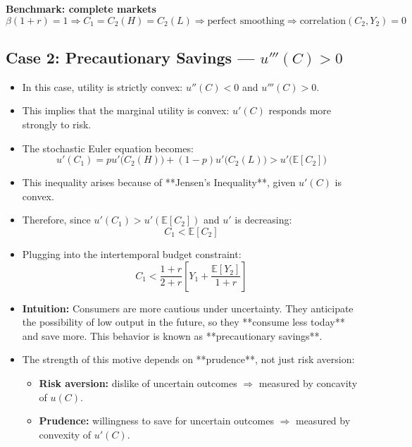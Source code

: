 \documentclass[12pt]{article}
\begin{document}
\textbf{Benchmark: complete markets}
\[
\beta(1 + r) = 1 \Rightarrow C_1 = C_2(H) = C_2(L) \Rightarrow \text{perfect smoothing}
\Rightarrow \text{correlation}(C_2, Y_2) = 0
\]

\subsection*{\noindent\textbf{Case 2: Precautionary Savings --- $u'''(C) > 0$}}  

\begin{itemize}
    \item In this case, utility is strictly convex: $u''(C) < 0$ and $u'''(C) > 0$.
    \item This implies that the marginal utility is convex: $u'(C)$ responds more strongly to risk.
    
    \item The stochastic Euler equation becomes:
    \[
    u'(C_1) = pu'\big(C_2(H)\big) + (1 - p)u'\big(C_2(L)\big) > u'\big(\mathbb{E}[C_2]\big)
    \]
    
    \item This inequality arises because of **Jensen's Inequality**, given $u'(C)$ is convex.

    \item Therefore, since $u'(C_1) > u'(\mathbb{E}[C_2])$ and $u'$ is decreasing:
    \[
    C_1 < \mathbb{E}[C_2]
    \]
    
    \item Plugging into the intertemporal budget constraint:
    \[
    C_1 < \frac{1 + r}{2 + r}\left[Y_1 + \frac{\mathbb{E}[Y_2]}{1 + r} \right]
    \]
    
    \item \textbf{Intuition:}  
    Consumers are more cautious under uncertainty. They anticipate the possibility of low output in the future, so they **consume less today** and save more. This behavior is known as **precautionary savings**.
    
    \item The strength of this motive depends on **prudence**, not just risk aversion:
    \begin{itemize}
        \item \textbf{Risk aversion:} dislike of uncertain outcomes $\Rightarrow$ measured by concavity of $u(C)$.
        \item \textbf{Prudence:} willingness to save for uncertain outcomes $\Rightarrow$ measured by convexity of $u'(C)$.
    \end{itemize}
    

\end{itemize}
\end{document}
